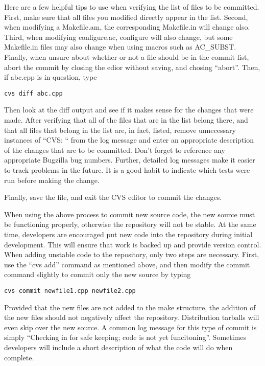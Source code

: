 \documentclass[12pt,relax]{SANDreport}
\begin{document}
\begin{enumerate}
Here are a few helpful tips to use when verifying the list of files 
to be committed.  First, make sure that all files you modified directly appear 
in the list.  Second, when modifying a Makefile.am, the corresponding 
Makefile.in will change also.  Third, when modifying configure.ac, configure 
will also change, but some Makefile.in files may also change when using macros 
such as AC_SUBST.  Finally, when unsure about whether or not a file should be 
in the commit list, abort the commit by closing the edior without saving, and 
chosing ``abort''.  Then, if abc.cpp is in question, type 
\begin{verbatim}
cvs diff abc.cpp
\end{verbatim}
Then look at the diff output and see if it makes sense for the changes that 
were made.  After verifying that all of the files that are in the list belong 
there, and that all files that belong in the list are, in fact, listed, remove 
unnecessary instances of ``CVS: `` from the log message and enter an 
appropriate description of the changes that are to be committed.  Don't forget 
to reference any appropriate Bugzilla bug numbers.  Further, detailed log 
messages make it easier to track problems in the future.  It is a good habit 
to indicate which tests were run before making the change.

Finally, save the file, and exit the CVS editor to commit the changes.

When using the above process to commit new source code, the new source must 
be functioning properly, otherwise the repository will not be stable.  
At the same time, developers are encouraged put new code into the repository 
during initial development.  This will ensure that work is backed up and 
provide version control.  When adding unstable code to the repository, only
two steps are necessary.  First, use the ``cvs add'' command as mentioned 
above, and then modify the commit command slightly to commit only the new 
source by typing
\begin{verbatim}
cvs commit newfile1.cpp newfile2.cpp
\end{verbatim}
Provided that the new files are not added to the make structure, the addition 
of the new files should not negatively affect the repository.  Distribution 
tarballs will even skip over the new source.  A common log message for this 
type of commit is simply ``Checking in for safe keeping; code is not yet 
funcitoning''.  Sometimes developers will include a short description of what 
the code will do when complete.
\end{enumerate}
\end{document}
